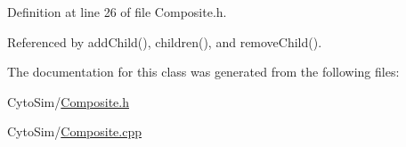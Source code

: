 Definition at line 26 of file Composite.\-h.



Referenced by add\-Child(), children(), and remove\-Child().



The documentation for this class was generated from the following files\-:\begin{DoxyCompactItemize}
\item 
Cyto\-Sim/\hyperlink{Composite_8h}{Composite.\-h}\item 
Cyto\-Sim/\hyperlink{Composite_8cpp}{Composite.\-cpp}\end{DoxyCompactItemize}
